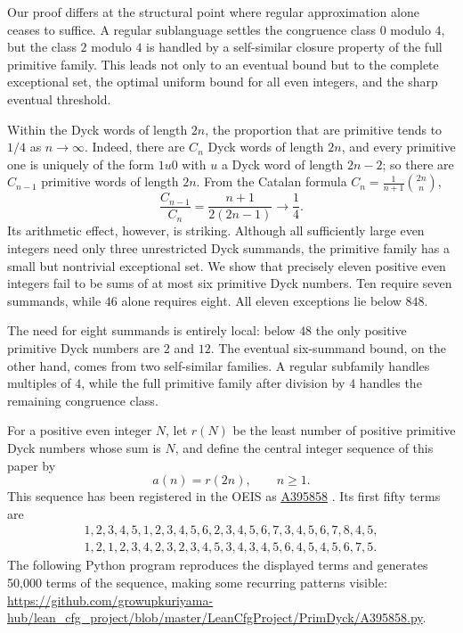 \documentclass[12pt]{article}
\theoremstyle{plain}
\newcommand{\seqnum}[1]{\href{https://oeis.org/#1}{\rm \underline{#1}}}
\begin{document}
Our proof differs at the structural point where regular approximation
alone ceases to suffice.  A regular sublanguage settles the congruence
class $0$ modulo $4$, but the class $2$ modulo $4$ is handled by a
self-similar closure property of the full primitive family.  This leads
not only to an eventual bound but to the complete exceptional set, the
optimal uniform bound for all even integers, and the sharp eventual
threshold.

Within the Dyck words of length $2n$, the proportion that are primitive
tends to $1/4$ as $n\to\infty$.  Indeed, there are $C_n$ Dyck words of
length $2n$, and every primitive one is uniquely of the form $1u0$ with
$u$ a Dyck word of length $2n-2$; so there are $C_{n-1}$ primitive words
of length $2n$.  From the Catalan formula
$C_n=\frac1{n+1}\binom{2n}{n}$,
\[
 \frac{C_{n-1}}{C_n}=\frac{n+1}{2(2n-1)}\longrightarrow\frac14 .
\]
Its arithmetic effect, however, is striking.  Although all sufficiently
large even integers need only three unrestricted Dyck summands, the
primitive family has a small but nontrivial exceptional set.  We show
that precisely eleven positive even integers fail to be sums of at most
six primitive Dyck numbers.  Ten require seven summands, while $46$
alone requires eight.  All eleven exceptions lie below $848$.

The need for eight summands is entirely local: below $48$ the only
positive primitive Dyck numbers are $2$ and $12$.  The eventual
six-summand bound, on the other hand, comes from two self-similar
families.  A regular subfamily handles multiples of $4$, while the full
primitive family after division by $4$ handles the remaining congruence
class.

For a positive even integer $N$, let $r(N)$ be the least number of
positive primitive Dyck numbers whose sum is $N$, and define the central
integer sequence of this paper by
\[
        a(n)=r(2n),\qquad n\geq1.
\]
This sequence has been registered in the OEIS as
\seqnum{A395858} \cite{OEIS-A395858}.  Its first fifty terms are
\[
\begin{gathered}
1,2,3,4,5,1,2,3,4,5,6,2,3,4,5,6,7,3,4,5,6,7,8,4,5,\\
1,2,1,2,3,4,2,3,2,3,4,5,3,4,3,4,5,6,4,5,4,5,6,7,5.
\end{gathered}
\]
The following Python program reproduces the displayed terms and generates
50,000 terms of the sequence, making some recurring patterns visible:
\url{https://github.com/growupkuriyama-hub/lean_cfg_project/blob/master/LeanCfgProject/PrimDyck/A395858.py}.
\end{document}
